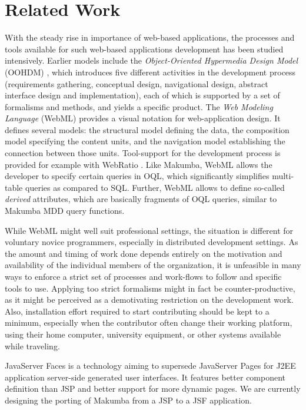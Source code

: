 \documentclass{chi2009}
\begin{document}
\section{Related Work}\label{sec:related}
With the steady rise in importance of web-based applications, the processes and tools available for such web-based applications development has been studied intensively. %
Earlier models include the \textit{Object-Oriented Hypermedia Design Model} (OOHDM) \cite{schwabe1998ooa}, which introduces five different activities in the development process (requirements gathering, conceptual design, navigational design, abstract interface design and implementation), each of which is supported by a set of formalisms and methods, and yields a specific product. The \textit{Web Modeling Language} (WebML) \cite{Ceri00webmodeling} provides a visual notation for web-application design. It defines several models: the structural model defining the data, the composition model specifying the content units, and the navigation model establishing the connection between those units. Tool-support for the development process is provided for example with WebRatio \cite{acerbis2004wit}. 
Like Makumba, WebML allows the developer to specify certain queries in OQL, which significantly simplifies multi-table queries as compared to SQL. Further, WebML allows to define so-called \textit{derived} attributes, which are basically fragments of OQL queries, similar to Makumba MDD query functions.

While WebML might well suit professional settings, the situation is different for voluntary novice programmers, especially in distributed development settings. As the amount and timing of work done depends entirely on the motivation and availability of the individual members of the organization, it is unfeasible in many ways to enforce a strict set of processes and work-flows to follow and specific tools to use. Applying too strict formalisms might in fact be counter-productive, as it might be perceived as a demotivating restriction on the development work. Also, installation effort required to start contributing should be kept to a minimum, especially when the contributor often change their working platform, using their home computer, university equipment, or other systems available while traveling.

JavaServer Faces is a technology aiming to supersede JavaServer Pages for J2EE application server-side generated user interfaces. It features better component definition than JSP and better support for more dynamic pages. We are currently designing the porting of Makumba from a JSP to a JSF application.
\end{document}
